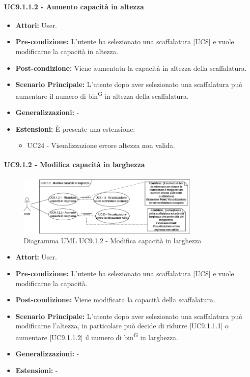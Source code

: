 \paragraph{UC9.1.1.2 - Aumento capacità in altezza}
\begin{itemize}
    \item \textbf{Attori:} User.
    \item \textbf{Pre-condizione:} L'utente ha selezionato una scaffalatura [UC8] e vuole modificarne la capacità in altezza.
    \item \textbf{Post-condizione:} Viene aumentata la capacità in altezza della scaffalatura.
    \item \textbf{Scenario Principale:} L'utente dopo aver selezionato una scaffalatura può aumentare il numero di bin\textsuperscript{G} in altezza della scaffalatura.
    \item \textbf{Generalizzazioni:} -
    \item \textbf{Estensioni:} È presente una estensione:
    \begin{itemize}
        \item UC24 - Visualizzazione errore altezza non valida.
    \end{itemize}
\end{itemize}


\paragraph{UC9.1.2 - Modifica capacità in larghezza}
\begin{figure}[H]
  \centering
  \includegraphics[width=0.8\textwidth]{UC_diagrams_1-10/UC9.1.2.drawio.png}
   \caption{Diagramma UML UC9.1.2 - Modifica capacità in larghezza}
\end{figure}
\begin{itemize}
    \item \textbf{Attori:} User.
    \item \textbf{Pre-condizione:} L'utente ha selezionato una scaffalatura [UC8] e vuole modificarne la capacità.
    \item \textbf{Post-condizione:} Viene modificata la capacità della scaffalatura.
    \item \textbf{Scenario Principale:} L'utente dopo aver selezionato una scaffalatura può modificarne l'altezza, in particolare può decide di ridurre [UC9.1.1.1] o aumentare [UC9.1.1.2] il numero di bin\textsuperscript{G} in larghezza.
    \item \textbf{Generalizzazioni:} -
    \item \textbf{Estensioni:} -
\end{itemize}


